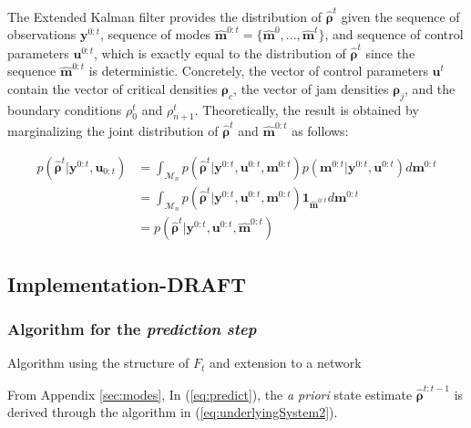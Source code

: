 The Extended Kalman filter provides the distribution of $\hat{\boldsymbol\rho}^{t}$ given the sequence of observations $\boldsymbol y^{0:t}$, sequence of modes $\hat{\boldsymbol m}^{0:t} = \{\hat{\boldsymbol m}^{0},...,\hat{\boldsymbol m}^{t}\}$, and sequence of control parameters $\boldsymbol u^{0:t}$, which is exactly equal to the distribution of $\hat{\boldsymbol\rho}^{t}$ since the sequence $\hat{\boldsymbol m}^{0:t}$ is deterministic. Concretely, the vector of control parameters $\boldsymbol u^{t}$ contain the vector of critical densities $\boldsymbol\rho_{c}$, the vector of jam densities $\boldsymbol\rho_{j}$, and the boundary conditions $\rho^{t}_{0}$ and $\rho^{t}_{n+1}$. Theoretically, the result is obtained by marginalizing the joint distribution of $\hat{\boldsymbol\rho}^{t}$ and $\hat{\boldsymbol m}^{0:t}$ as follows:

\begin{equation}
\begin{array}{ll}
p(\hat{\boldsymbol\rho}^{t}|\boldsymbol y^{0:t},\boldsymbol u_{0:t}) & =
\int_{\mathcal{M}_{n}} p(\hat{\boldsymbol\rho}^{t}|\boldsymbol y^{0:t},\boldsymbol u^{0:t},\boldsymbol m^{0:t})p(\boldsymbol m^{0:t}|\boldsymbol y^{0:t},\boldsymbol u^{0:t})
d\boldsymbol m^{0:t}\\ 
& = \int_{\mathcal{M}_{n}} p(\hat{\boldsymbol\rho}^{t}|\boldsymbol y^{0:t},\boldsymbol u^{0:t},\boldsymbol m^{0:t})\boldsymbol 1_{\hat{\boldsymbol m}^{0:t}}d\boldsymbol m^{0:t}\\[1ex]
& = p(\hat{\boldsymbol\rho}^{t}|\boldsymbol y^{0:t},\boldsymbol u^{0:t},\hat{\boldsymbol m}^{0:t})
\label{eq:marginalization}
\end{array}
\end{equation}

\subsection{Implementation-DRAFT}

\subsubsection{Algorithm for the \textit{prediction step}}

Algorithm using the structure of $F_{t}$ and extension to a network

From Appendix \ref{sec:modes},  In (\ref{eq:predict}), the \textit{a priori} state estimate $\hat{\boldsymbol\rho}^{t:t-1}$ is derived through the algorithm in (\ref{eq:underlyingSystem2}).

